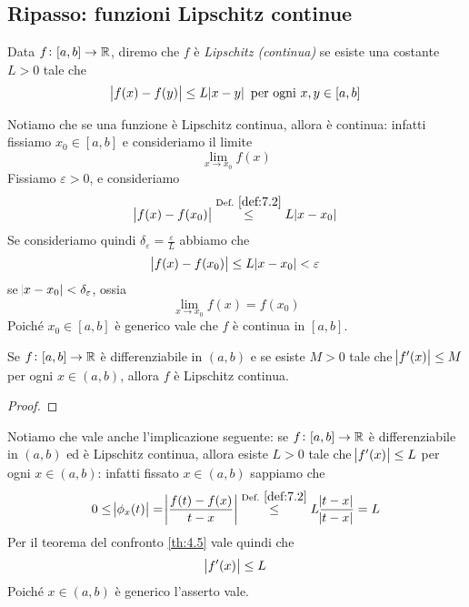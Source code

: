 \subsection{Ripasso: funzioni Lipschitz continue}
\begin{definition}
    \label{def:7.2}
    Data $f\colon[a,b]\to \amsbb{R}$, diremo che $f$ è \emph{Lipschitz (continua)} se esiste una costante $L>0$ tale che
    \[
    \abs{f(x)-f(y)}\le L \abs{x-y} \ \text{per ogni} \ x,y\in[a,b]
    \]
\end{definition}
\begin{remark}
    Notiamo che se una funzione è Lipschitz continua, allora è continua: infatti fissiamo $x_0\in[a,b]$ e consideriamo il limite 
    \[
    \lim_{x\to x_0} f(x)
    \]
    Fissiamo $\varepsilon>0$, e consideriamo
    \[
    \abs{f(x)-f(x_0)}\overset{\text{Def.} \ \ref{def:7.2}}{\le}  L\abs{x-x_0}
    \]
    Se consideriamo quindi $\delta_\varepsilon = \frac{\varepsilon}{L}$ abbiamo che
    \[
    \abs{f(x)-f(x_0)}\le L \abs{x-x_0}<\varepsilon
    \]
    se $\abs{x-x_0}<\delta_\varepsilon$, ossia 
    \[
    \lim_{x\to x_0} f(x) = f(x_0)
    \]
    Poiché $x_0\in[a,b]$ è generico vale che $f$ è continua in $[a,b]$.
\end{remark}
\begin{theorem}
    \label{th:7.4}
    Se $f\colon[a,b]\to \amsbb{R}$ è differenziabile in $(a,b)$ e se esiste $M> 0$ tale che $\abs{f'(x)}\le M$ per ogni $x\in(a,b)$, allora $f$ è Lipschitz continua.
\end{theorem}
\begin{proof}
    
\end{proof}
\begin{remark}
    Notiamo che vale anche l'implicazione seguente: se $f\colon[a,b]\to \amsbb{R}$ è differenziabile in $(a,b)$ ed è Lipschitz continua, allora esiste $L>0$ tale che $\abs{f'(x)}\le L$ per ogni $x\in(a,b)$: infatti fissato $x\in(a,b)$ sappiamo che
    \[
    0\le \abs{\phi_x(t)} = \abs{\frac{f(t)-f(x)}{t-x}} \overset{\text{Def.} \ \ref{def:7.2}}{\le } L \frac{\abs{t-x}}{\abs{t-x}} = L
    \]
    Per il teorema del confronto \ref{th:4.5} vale quindi che
    \[
    \abs{f'(x)}\le L
    \]
    Poiché $x\in(a,b)$ è generico l'asserto vale.
\end{remark}
